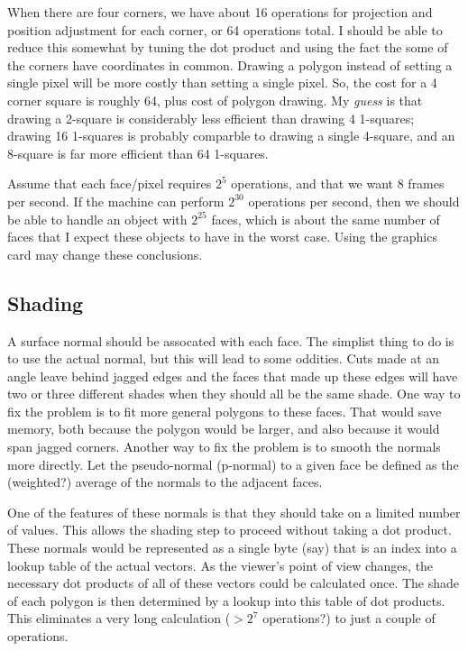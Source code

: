 \documentclass[titlepage,oneside,10pt]{article}
\begin{document}
When there are four corners, we have about 16 operations for
projection and position adjustment for each corner, or 64 operations
total. I should be able to reduce this somewhat by tuning the
dot product and using the fact the some of the corners have
coordinates in common. Drawing a polygon instead of setting a single
pixel will be more costly than setting a single pixel. So, the cost
for a 4 corner square is roughly 64, plus cost of polygon drawing. My
\emph{guess} is that drawing a 2-square is considerably less efficient
than drawing 4 1-squares; drawing 16 1-squares is probably comparble
to drawing a single 4-square, and an 8-square is far more efficient
than 64 1-squares. 

Assume that each face/pixel requires $2^5$ operations, and that we
want 8 frames per second. If the machine can perform $2^{30}$
operations per second, then we should be able to handle an object with
$2^{25}$ faces, which is about the same number of faces that I expect
these objects to have in the worst case. Using the graphics card may
change these conclusions.

\subsection{Shading}

A surface normal should be assocated with each face. The simplist
thing to do is to use the actual normal, but this will lead to some
oddities. Cuts made at an angle leave behind jagged edges and the
faces that made up these edges will have two or three different shades
when they should all be the same shade. One way to fix the problem is
to fit more general polygons to these faces. That would save memory,
both because the polygon would be larger, and also because it would
span jagged corners. Another way to fix the problem is to smooth the
normals more directly. Let the pseudo-normal (p-normal) to a given
face be defined as the (weighted?) average of the normals to the
adjacent faces.

One of the features of these normals is that they should take on a
limited number of values. This allows the shading step to proceed
without taking a dot product. These normals would be represented as a
single byte (say) that is an index into a lookup table of the actual
vectors. As the viewer's point of view changes, the necessary dot
products of all of these vectors could be calculated once. The shade
of each polygon is then determined by a lookup into this table of dot
products. This eliminates a very long calculation ($>2^7$ operations?)
to just a couple of operations.
\end{document}
